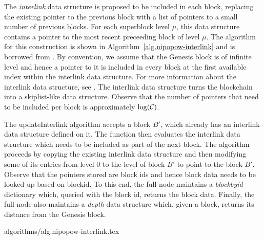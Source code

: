 The \textit{interlink} data structure is proposed to be included in each block,
replacing the existing pointer to the previous block with a list of pointers to
a small number of previous blocks. For each superblock level $\mu$, this data
structure contains a pointer to the most recent preceeding block of level
$\mu$. The algorithm for this construction is shown in
Algorithm~\ref{alg.nipopow-interlink} and is borrowed from \cite{KLS}. By
convention, we assume that the Genesis block is of infinite level and hence a
pointer to it is included in every block at the first available index within
the interlink data structure. For more information about the interlink data
structure, see \cite{KLS}. The interlink data structure turns the blockchain
into a skiplist-like data structure. Observe that the number of pointers that
need to be included per block is approximately $\log(\mathcal{C})$.

The updateInterlink algorithm accepts a block $B'$, which already has an
interlink data structure defined on it. The function then evaluates the
interlink data structure which needs to be included as part of the next block.
The algorithm proceeds by copying the existing interlink data structure and
then modifying some of its entries from level $0$ to the level of block $B'$ to
point to the block $B'$. Observe that the pointers stored are block ids and
hence block data needs to be looked up based on blockid. To this end, the full
node maintains a \textit{blockbyid} dictionary which, queried with the block
id, returns the block data. Finally, the full node also maintains a
\textit{depth} data structure which, given a block, returns its distance from
the Genesis block.

{algorithms/alg.nipopow-interlink.tex}
